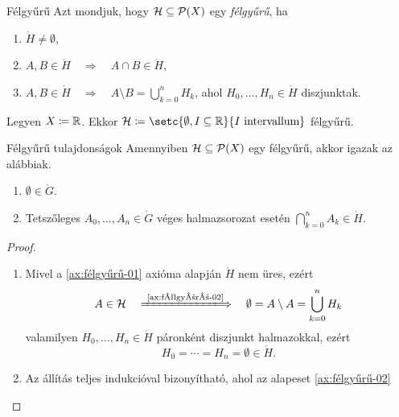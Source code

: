 \documentclass[
]{elteikthesis}[2024/04/26]
\begin{document}
	\begin{definition}{Félgyűrű}{}
		Azt mondjuk, hogy \( \mathcal{H} \subseteq \mathcal{P}( X ) \) egy \emph{félgyűrű}, ha
		\begin{enumerate}[label={(\( \ring{H} \)\arabic*)}, ref={\( \ring{H} \)\arabic*.}]
			\item\label{ax:félgyűrű-01}
			\( \ring{H} \neq \emptyset \),
			
			\item\label{ax:félgyűrű-02}
			\( A, B \in \ring{H} \quad \Longrightarrow \quad A \cap B \in \ring{H} \),
			
			\item\label{ax:félgyűrű-03}
			\(
				A, B \in \ring{H}
				\quad \Longrightarrow \quad
				A \setminus B = \bigcup\limits_{k=0}^{n} H_k
			\),
			ahol \( H_0, \dots, H_n \in \ring{H} \) diszjunktak.
		\end{enumerate}
	\end{definition}
	
	\begin{example}
		Legyen \( X \coloneq \mathbb{R} \).
		Ekkor \( \ring{H} \coloneq \setc{ \emptyset, I \subseteq \R }{ I \text{ intervallum} } \)
		félgyűrű.
	\end{example}
	
	\begin{statement}{Félgyűrű tulajdonságok}{}
		Amennyiben \( \mathcal{H} \subseteq \mathcal{P}( X ) \) egy félgyűrű, akkor igazak az alábbiak.
		\begin{enumerate}[label={(\( \ring{H} \)\arabic*)}, ref={\( \ring{H} \)\arabic*.}, start=4]
			\item
			\( \emptyset \in \ring{G} \).
			
			\item
			Tetszőleges \( A_0, \dots, A_n \in \ring{G} \) véges halmazsorozat esetén
			\(
				\bigcap\limits_{k=0}^{n} A_k \in \ring{H}
			\).
		\end{enumerate}
	\end{statement}
	\begin{proof}\,
		\begin{enumerate}[label={(\( \ring{H} \)\arabic*)}, ref={\( \ring{H} \)\arabic*.}, start=4]
			\item
			Mivel a \ref{ax:félgyűrű-01} axióma alapján \( \ring{H} \) nem üres, ezért
			\[
				A \in \ring{H}
				\quad \xLongrightarrow{\ \text{\ref{ax:félgyűrű-02}} } \quad
				\emptyset = A \setminus A = \bigcup\limits_{k=0}^{n} H_k
			\]
			valamilyen \( H_0, \dots, H_n \in \ring{H} \) páronként diszjunkt halmazokkal, ezért
			\[
				H_0 = \cdots = H_n = \emptyset \in \ring{H}.
			\]
			
			\item
			Az állítás teljes indukcióval bizonyítható, ahol az alapeset \ref{ax:félgyűrű-02}
		\end{enumerate}
	\end{proof}
	
\end{document}

